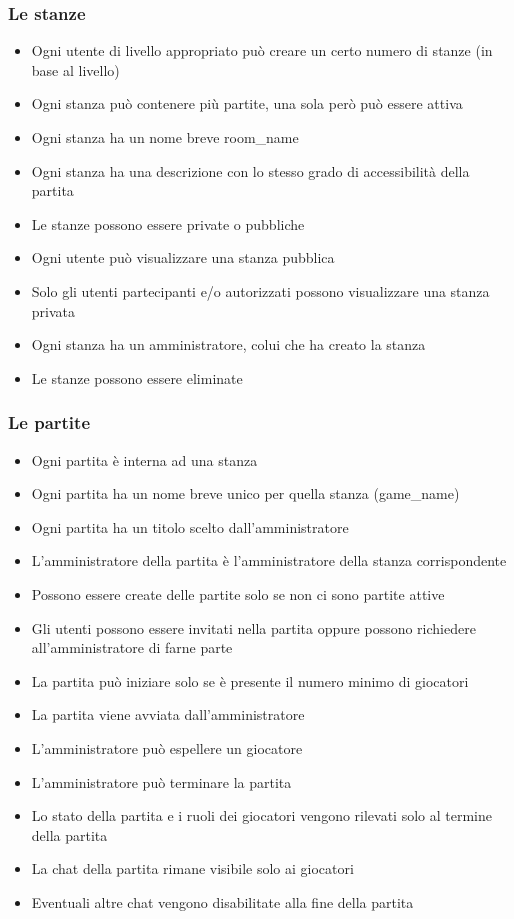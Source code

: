 \documentclass[10pt,a4paper]{article}
\begin{document}
\subsubsection{Le stanze}
\begin{itemize}
\item Ogni utente di livello appropriato può creare un certo numero di stanze (in base al livello)
\item Ogni stanza può contenere più partite, una sola però può essere attiva
\item Ogni stanza ha un nome breve \textsf{room\_name}
\item Ogni stanza ha una descrizione con lo stesso grado di accessibilità della partita
\item Le stanze possono essere private o pubbliche
\item Ogni utente può visualizzare una stanza pubblica
\item Solo gli utenti partecipanti e/o autorizzati possono visualizzare una stanza privata
\item Ogni stanza ha un amministratore, colui che ha creato la stanza
\item Le stanze possono essere eliminate
\end{itemize}

\subsubsection{Le partite}
\begin{itemize}
\item Ogni partita è interna ad una stanza
\item Ogni partita ha un nome breve unico per quella stanza (\textsf{game\_name})
\item Ogni partita ha un titolo scelto dall'amministratore
\item L'amministratore della partita è l'amministratore della stanza corrispondente
\item Possono essere create delle partite solo se non ci sono partite attive
\item Gli utenti possono essere invitati nella partita oppure possono richiedere all'amministratore di farne parte
\item La partita può iniziare solo se è presente il numero minimo di giocatori
\item La partita viene avviata dall'amministratore
\item L'amministratore può espellere un giocatore
\item L'amministratore può terminare la partita
\item Lo stato della partita e i ruoli dei giocatori vengono rilevati solo al termine della partita
\item La chat della partita rimane visibile solo ai giocatori
\item Eventuali altre chat vengono disabilitate alla fine della partita
\end{itemize}
\end{document}

